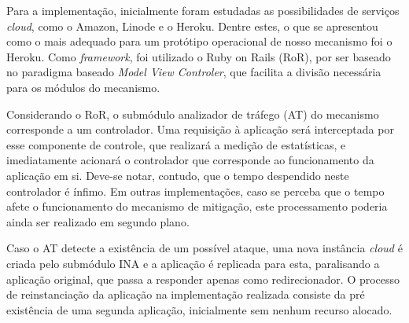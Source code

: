 Para a implementação, inicialmente foram estudadas as possibilidades de serviços \emph{cloud}, como o Amazon, Linode e o Heroku. Dentre estes, o que se apresentou como o mais adequado para um protótipo operacional de nosso mecanismo foi o Heroku. %
%
%
Como \emph{framework}, foi utilizado o Ruby on Rails (RoR),  por ser baseado no paradigma baseado \emph{Model View Controler}, que facilita a divisão necessária para os módulos do mecanismo. 

Considerando o RoR, o submódulo analizador de tráfego (AT) do mecanismo corresponde a um controlador. Uma requisição à aplicação será interceptada por esse componente de controle, que realizará a medição de estatísticas, e imediatamente acionará o controlador que corresponde ao funcionamento da aplicação em si. Deve-se notar, contudo, que o tempo despendido neste controlador é ínfimo. Em outras implementações, caso se perceba que o tempo afete o funcionamento do mecanismo de mitigação, este processamento poderia ainda ser realizado em segundo plano.

Caso o AT detecte a existência de um possível ataque, uma nova instância \emph{cloud} é criada pelo submódulo INA e a aplicação é replicada para esta, paralisando a aplicação original, que passa a responder apenas como redirecionador. O processo de reinstanciação da aplicação na implementação realizada consiste da pré existência de uma segunda aplicação, inicialmente sem nenhum recurso alocado. %

